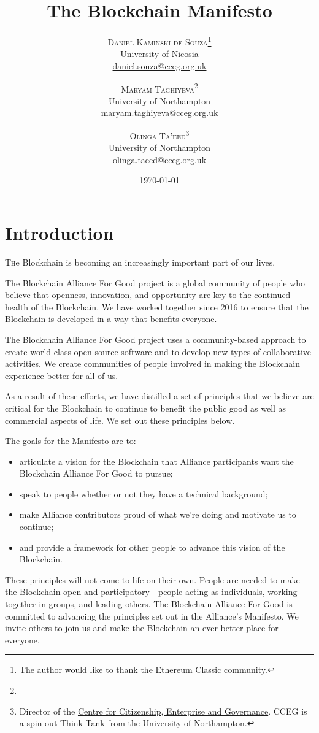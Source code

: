 \documentclass[twoside,twocolumn]{article}
\title{The Blockchain Manifesto} %
\author{%
\textsc{Daniel Kaminski de Souza}\thanks{The author would like to thank the
Ethereum Classic community.} \\[1ex] %
\normalsize University of Nicosia \\ %
\normalsize
\href{mailto:daniel.souza@cceg.org.uk}{daniel.souza@cceg.org.uk}
\and %
\textsc{Maryam Taghiyeva}\thanks{} \\[1ex] %
\normalsize University of Northampton \\ %
\normalsize \href{mailto:maryam.taghiyeva@cceg.org.uk}{maryam.taghiyeva@cceg.org.uk}
\and %
\textsc{Olinga Ta'eed}\thanks{Director of the \href{www.cceg.org.uk}{Centre for
Citizenship, Enterprise and Governance}. CCEG is a spin out Think Tank from the University of
Northampton.} \\[1ex] %
\normalsize University of Northampton \\ %
\normalsize \href{mailto:olinga.taeed@cceg.org.uk}{olinga.taeed@cceg.org.uk} %
}
\date{\today} %
\begin{document}
\maketitle


\section{Introduction}

\lettrine[nindent=0em,lines=3]{T}he Blockchain is becoming an increasingly
important part of our lives.

The Blockchain Alliance For Good project is a global community of people who
believe that openness, innovation, and opportunity are key to the continued
health of the Blockchain. We have worked together since 2016 to ensure that the
Blockchain is developed in a way that benefits everyone.

The Blockchain Alliance For Good project uses a community-based approach to
create world-class open source software and to develop new types of
collaborative activities. We create communities of people involved in making the
Blockchain experience better for all of us.

As a result of these efforts, we have distilled a set of principles that we
believe are critical for the Blockchain to continue to benefit the public good
as well as commercial aspects of life. We set out these principles below.

The goals for the Manifesto are to:

\begin{itemize}
  \item articulate a vision for the Blockchain that Alliance participants want
  the Blockchain Alliance For Good to pursue;
  \item speak to people whether or not they have a technical
background;
  \item make Alliance contributors proud of what we're doing and motivate us
to continue;
  \item and provide a framework for other people to advance this vision of
the Blockchain.
\end{itemize}

These principles will not come to life on their own. People are needed to make
the Blockchain open and participatory - people acting as individuals, working
together in groups, and leading others. The Blockchain Alliance For Good is
committed to advancing the principles set out in the Alliance's Manifesto. We
invite others to join us and make the Blockchain an ever better place for
everyone.
\end{document}
